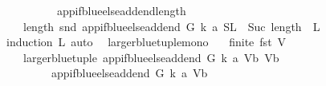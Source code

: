 \begin{isabellebody}
\endisatagproof
{\isafoldproof}%
%
\isadelimproof
\ \ \isanewline
%
\endisadelimproof
\ \ \isanewline
\isanewline
\ \ \isanewline
{}\isamarkupfalse%
\ app{\isacharunderscore}{\kern0pt}if{\isacharunderscore}{\kern0pt}blue{\isacharunderscore}{\kern0pt}else{\isacharunderscore}{\kern0pt}add{\isacharunderscore}{\kern0pt}end{\isacharunderscore}{\kern0pt}length{\isacharcolon}{\kern0pt}\isanewline
\ \ \ {\isachardoublequoteopen}length\ {\isacharparenleft}{\kern0pt}snd\ {\isacharparenleft}{\kern0pt}app{\isacharunderscore}{\kern0pt}if{\isacharunderscore}{\kern0pt}blue{\isacharunderscore}{\kern0pt}else{\isacharunderscore}{\kern0pt}add{\isacharunderscore}{\kern0pt}end\ G\ k\ a\ {\isacharparenleft}{\kern0pt}S{\isacharcomma}{\kern0pt}L{\isacharparenright}{\kern0pt}{\isacharparenright}{\kern0pt}{\isacharparenright}{\kern0pt}\ {\isacharequal}{\kern0pt}\ Suc\ {\isacharparenleft}{\kern0pt}length\ \ L{\isacharparenright}{\kern0pt}{\isachardoublequoteclose}\isanewline
%
\isadelimproof
%
\endisadelimproof
%
\isatagproof
{}\isamarkupfalse%
{\isacharparenleft}{\kern0pt}induction\ L{\isacharcomma}{\kern0pt}\ auto{\isacharparenright}{\kern0pt}\ \isamarkupfalse%
%
\endisatagproof
{\isafoldproof}%
%
\isadelimproof
%
\endisadelimproof
%
\isadelimdocument
%
\endisadelimdocument
%
\isatagdocument
%
\isamarkuptrue%
%
\endisatagdocument
{\isafolddocument}%
%
\isadelimdocument
%
\endisadelimdocument
{}\isamarkupfalse%
\ larger{\isacharunderscore}{\kern0pt}blue{\isacharunderscore}{\kern0pt}tuple{\isacharunderscore}{\kern0pt}mono{\isacharcolon}{\kern0pt}\isanewline
\ \ \ {\isachardoublequoteopen}finite\ {\isacharparenleft}{\kern0pt}fst\ V{\isacharparenright}{\kern0pt}{\isachardoublequoteclose}\isanewline
\ \ \ {\isachardoublequoteopen}larger{\isacharunderscore}{\kern0pt}blue{\isacharunderscore}{\kern0pt}tuple\ {\isacharparenleft}{\kern0pt}{\isacharparenleft}{\kern0pt}app{\isacharunderscore}{\kern0pt}if{\isacharunderscore}{\kern0pt}blue{\isacharunderscore}{\kern0pt}else{\isacharunderscore}{\kern0pt}add{\isacharunderscore}{\kern0pt}end\ G\ k\ a\ V{\isacharparenright}{\kern0pt}{\isacharcomma}{\kern0pt}b{\isacharparenright}{\kern0pt}\ {\isacharparenleft}{\kern0pt}V{\isacharcomma}{\kern0pt}b{\isacharparenright}{\kern0pt}\isanewline
\ \ \ \ \ \ \ {\isacharequal}{\kern0pt}\ {\isacharparenleft}{\kern0pt}{\isacharparenleft}{\kern0pt}app{\isacharunderscore}{\kern0pt}if{\isacharunderscore}{\kern0pt}blue{\isacharunderscore}{\kern0pt}else{\isacharunderscore}{\kern0pt}add{\isacharunderscore}{\kern0pt}end\ G\ k\ a\ V{\isacharparenright}{\kern0pt}{\isacharcomma}{\kern0pt}b{\isacharparenright}{\kern0pt}{\isachardoublequoteclose}\ \isanewline

\end{isabellebody}
